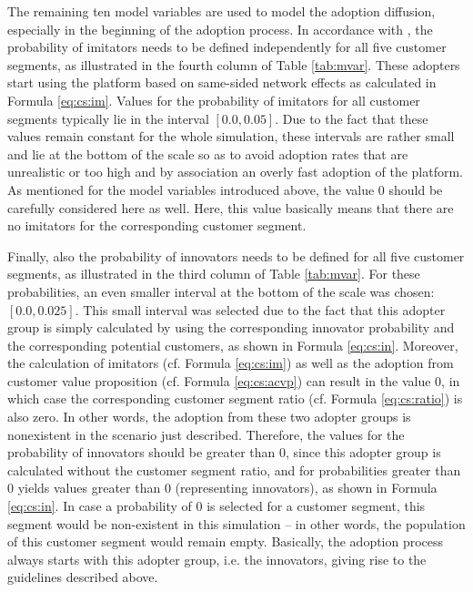 The remaining ten model variables are used to model the adoption diffusion, especially in the beginning of the adoption process. In accordance with \citet[p. 19]{Sterman2001}, the probability of imitators needs to be defined independently for all five customer segments, as illustrated in the fourth column of Table \ref{tab:mvar}. These adopters start using the platform based on same-sided network effects as calculated in Formula \ref{eq:cs:im}. Values for the probability of imitators for all customer segments typically lie in the interval $[0.0, 0.05]$. Due to the fact that these values remain constant for the whole simulation, these intervals are rather small and lie at the bottom of the scale so as to avoid adoption rates that are unrealistic or too high and by association an overly fast adoption of the platform. As mentioned for the model variables introduced above, the value $0$ should be carefully considered here as well. Here, this value basically means that there are no imitators for the corresponding customer segment.

Finally, also the probability of innovators needs to be defined for all five customer segments, as illustrated in the third column of Table \ref{tab:mvar}. For these probabilities, an even smaller interval at the bottom of the scale was chosen: $[0.0,0.025]$. This small interval was selected due to the fact that this adopter group is simply calculated by using the corresponding innovator probability and the corresponding potential customers, as shown in Formula \ref{eq:cs:in}. Moreover, the calculation of imitators (cf. Formula \ref{eq:cs:im}) as well as the adoption from customer value proposition (cf. Formula \ref{eq:cs:acvp}) can result in the value $0$, in which case the corresponding customer segment ratio (cf. Formula \ref{eq:cs:ratio}) is also zero. In other words, the adoption from these two adopter groups is nonexistent in the scenario just described. Therefore, the values for the probability of innovators should be greater than $0$, since this adopter group is calculated without the customer segment ratio, and for probabilities greater than $0$ yields values greater than $0$ (representing innovators), as shown in Formula \ref{eq:cs:in}. In case a probability of $0$ is selected for a customer segment, this segment would be non-existent in this simulation -- in other words, the population of this customer segment would remain empty. Basically, the adoption process always starts with this adopter group, i.e. the innovators, giving rise to the guidelines described above.


